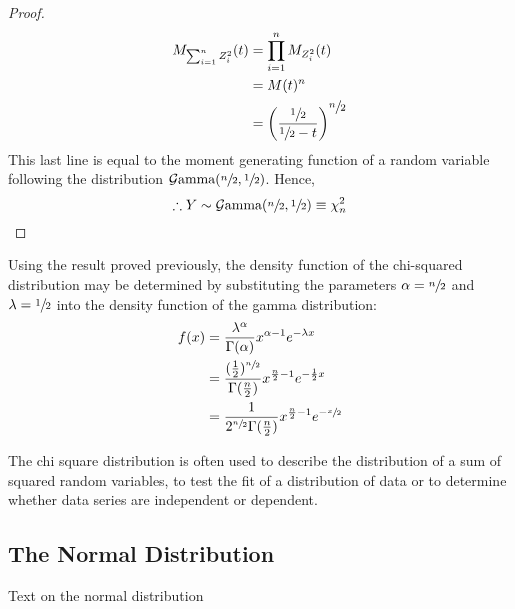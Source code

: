 \documentclass[12pt]{article}
\newcommand{\G}{\mathcal{G}}
\begin{document}
\begin{proof}
\begin{equation*}
		\begin{split}
			M_{\sum^n_{i=1}Z^2_i}(t)	&=	\prod^n_{i=1}M_{Z^2_i}(t)\\
										&=	M(t)^n\\
										&=	\left(\frac{\sfrac{1}{2}}{\sfrac{1}{2}-t}\right)^{\displaystyle\sfrac{n}{2}}
		\end{split}
	\end{equation*}
	This last line is equal to the moment generating function of a random variable following the distribution
	$\G\text{amma}(\sfrac{n}{2}, \sfrac{1}{2})$. Hence,
	\begin{equation*}
		\therefore Y\sim\G\text{amma}(\sfrac{n}{2}, \sfrac{1}{2})\equiv \chi^2_n
	\end{equation*}
\end{proof}

Using the result proved previously, the density function of the chi-squared distribution may be determined by
substituting the parameters $\alpha = \sfrac{n}{2}$ and $\lambda = \sfrac{1}{2}$ into the density function of the gamma
distribution:
\begin{equation*}\label{eq:chisquared-density}
	\begin{split}
		f(x)	&=	\frac{\lambda^\alpha}{\Gamma(\alpha)}x^{\alpha-1}e^{-\lambda x}\\
				&=	\frac{(\frac{1}{2})^{\sfrac{n}{2}}}{\Gamma(\frac{n}{2})}x^{\frac{n}{2}-1}e^{-\frac{1}{2}x}\\
				&=	\frac{1}{2^{\sfrac{n}{2}}\Gamma(\frac{n}{2})}x^{\frac{n}{2}-1}e^{-\sfrac{x}{2}}
	\end{split}
\end{equation*}


The chi square distribution is often used to describe the distribution of a sum of squared random variables, to test the
fit of a distribution of data or to determine whether data series are independent or dependent.

\subsection{The Normal Distribution}
Text on the normal distribution

\end{document}
